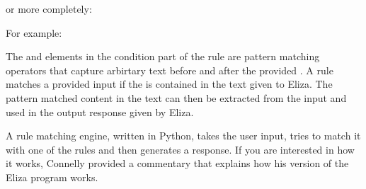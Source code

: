 \documentclass[letterpaper,10pt,english]{sphinxmanual}
\begin{document}
\begin{sphinxVerbatim}[commandchars=\\\{\}]
 \PYG{p}{[}
    \PYG{p}{]}
\end{sphinxVerbatim}

or more completely:

\begin{sphinxVerbatim}[commandchars=\\\{\}]
 \PYG{p}{[}
        \PYG{p}{]}
\end{sphinxVerbatim}

For example:

\begin{sphinxVerbatim}[commandchars=\\\{\}]
 \PYG{p}{[}
    \PYG{p}{]}
\end{sphinxVerbatim}

The  and  elements in the condition part of the rule are pattern matching operators that capture arbirtary text before and after the provided . A rule matches a provided input if the  is contained in the text given to Eliza. The pattern matched content in the text can then be extracted from the input and used in the output response given by Eliza.

A rule matching engine, written in Python, takes the user input, tries to match it with one of the rules and then generates a response. If you are interested in how it works, Connelly provided a commentary  that explains how his version of the Eliza program works.
\end{document}
